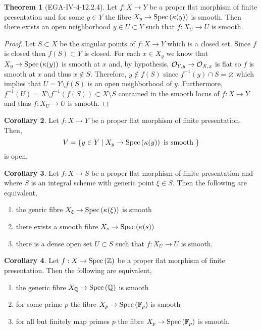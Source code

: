 \documentclass[12pt]{extarticle}
\newcommand{\Z}{\mathbb{Z}}
\theoremstyle{definition}
\newtheorem{theorem}{Theorem}[section]
\newtheorem{corollary}[theorem]{Corollary}
\begin{document}
\begin{theorem}[EGA-IV-4-12.2.4]
Let $f : X \to Y$ be a proper flat morphism of finite presentation and for some $y \in Y$ the fibre $X_y \to \mathrm{Spec}\left(\kappa(y)\right)$ is smooth. Then there exists an open neighborhood $y \in U \subset Y$ such that $f : X_U \to U$ is smooth.   
\end{theorem}

\begin{proof}
Let $S \subset X$ be the singular points of $f : X \to Y$ which is a closed set. Since $f$ is closed then $f(S) \subset Y$ is closed. For each $x \in X_y$ we know that $X_y \to \mathrm{Spec}\left(\kappa(y)\right)$ is smooth at $x$ and, by hypothesis, $\mathcal{O}_{Y, y} \to \mathcal{O}_{X, x}$ is flat so $f$ is smooth at $x$ and thus $x \notin S$. Therefore, $y \notin f(S)$ since $f^{-1}(y) \cap S = \varnothing$ which implies that $U = Y \setminus f(S)$ is an open neighborhood of $y$. Furthermore, $f^{-1}(U) = X \setminus f^{-1}(f(S)) \subset X \setminus S$ contained in the smooth locus of $f : X \to Y$ and thus $f : X_U \to U$ is smooth. 
\end{proof}

\begin{corollary}
Let $f : X \to Y$ be a proper flat morphism of finite presentation. Then,
\[ V = \{ y \in Y \mid X_y \to \mathrm{Spec}\left(\kappa(y)\right) \text{ is smooth } \} \]
is open.
\end{corollary}

\begin{corollary}
Let $f : X \to S$ be a proper flat morphism of finite presentation and where $S$ is an integral scheme with generic point $\xi \in S$. Then the following are equivalent,
\begin{enumerate}
\item the genric fibre $X_\xi \to \mathrm{Spec}\left(\kappa(\xi)\right)$ is smooth
\item there exists a smooth fibre $X_s \to \mathrm{Spec}\left(\kappa(s)\right)$
\item there is a dense open set $U \subset S$ such that $f : X_U \to U$ is smooth. 
\end{enumerate}
\end{corollary}

\begin{corollary}
Let $f : X \to \Spec{\Z}$ be a proper flat morphism of finite presentation. Then the following are equivalent,
\begin{enumerate}
\item the generic fibre $X_{\mathbb{Q}} \to \mathrm{Spec}\left(\mathbb{Q}\right)$ is smooth
\item for some prime $p$ the fibre $X_{p} \to \mathrm{Spec}\left(\mathbb{F}_p\right)$ is smooth
\item for all but finitely map primes $p$ the fibre $X_p \to \mathrm{Spec}\left(\mathbb{F}_p\right)$ is smooth. 
\end{enumerate}
\end{corollary}
\end{document}
